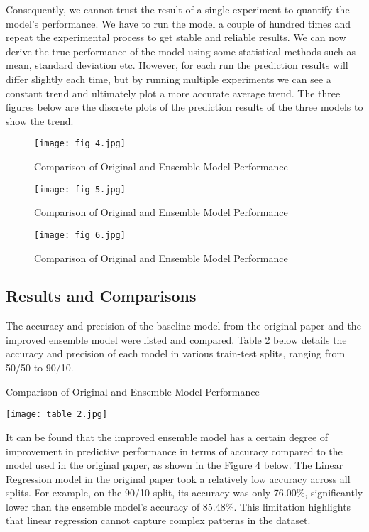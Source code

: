 \documentclass[conference]{IEEEtran}
\begin{document}
Consequently, we cannot trust the result of a single experiment to quantify the model's performance. We have to run the model a couple of hundred times and repeat the experimental process to get stable and reliable results. We can now derive the true performance of the model using some statistical methods such as mean, standard deviation etc. However, for each run the prediction results will differ slightly each time, but by running multiple experiments we can see a constant trend and ultimately plot a more accurate average trend. The three figures below are the discrete plots of the prediction results of the three models to show the trend.


\begin{figure}[h]
    \centering
    \texttt{[image: fig 4.jpg]}
    \caption{Comparison of Original and Ensemble Model Performance}
    \label{fig:Accuracy Trends of Linear Model Predictions}
\end{figure}

\begin{figure}[h]
    \centering
    \texttt{[image: fig 5.jpg]}
    \caption{Comparison of Original and Ensemble Model Performance}
    \label{fig:Accuracy Trends of Logistic Regression Model Predictions}
\end{figure}

\begin{figure}[h]
    \centering
    \texttt{[image: fig 6.jpg]}
    \caption{Comparison of Original and Ensemble Model Performance}
    \label{fig:Accuracy Trends of Ensemble Model Predictions}
\end{figure}


\subsection{Results and Comparisons}

The accuracy and precision of the baseline model from the original paper and the improved ensemble model were listed and compared. Table 2 below details the accuracy and precision of each model in various train-test splits, ranging from 50/50 to 90/10.

\begin{table}[!h]
\centering
\caption{Comparison of Original and Ensemble Model Performance}
\texttt{[image: table 2.jpg]}
\label{tab:comparison}
\end{table}

It can be found that the improved ensemble model has a certain degree of improvement in predictive performance in terms of accuracy compared to the model used in the original paper, as shown in the Figure 4 below. The Linear Regression model in the original paper took a relatively low accuracy across all splits. For example, on the 90/10 split, its accuracy was only 76.00\%, significantly lower than the ensemble model’s accuracy of 85.48\%. This limitation highlights that linear regression cannot capture complex patterns in the dataset.
\end{document}
